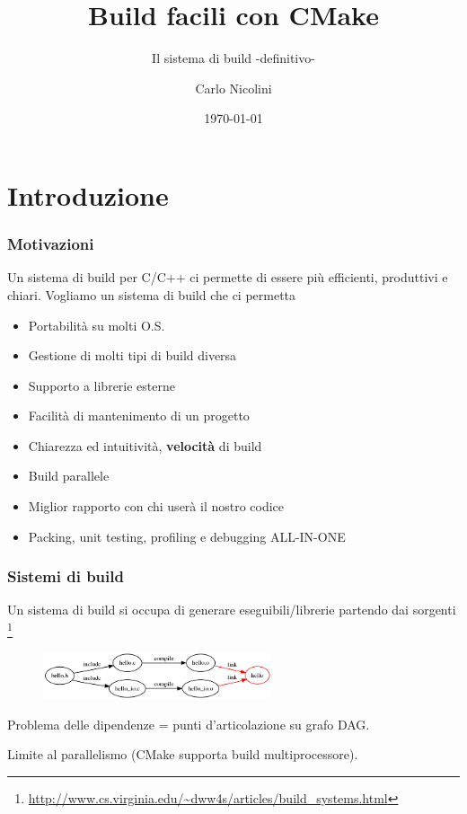 \documentclass[10pt] {beamer}
\title{Build facili con CMake}
\subtitle{Il sistema di build -definitivo-}
\author{Carlo Nicolini}
\date{\today}
\begin{document}
\frame{\titlepage}


\section{Introduzione}
\begin{frame}
\frametitle{Motivazioni}
Un sistema di build per C/C++ ci permette di essere più efficienti, produttivi e chiari.
Vogliamo un sistema di build che ci permetta
\begin{itemize}
\item<1-> Portabilità su molti O.S.
\item<2-> Gestione di molti tipi di build diversa
\item<3-> Supporto a librerie esterne
\item<4-> Facilità di mantenimento di un progetto
\item<5-> Chiarezza ed intuitività, \textbf{velocità} di build
\item<6-> Build parallele
\item<7-> Miglior rapporto con chi userà il nostro codice
\item<8-> Packing, unit testing, profiling e debugging ALL-IN-ONE
\end{itemize}
\end{frame}

\begin{frame}
\frametitle{Sistemi di build}
Un sistema di build si occupa di generare eseguibili/librerie partendo dai sorgenti \footnote{\url{http://www.cs.virginia.edu/~dww4s/articles/build_systems.html}}
\begin{figure}[htb]
 \centering
 \includegraphics[width=0.6\textwidth]{images/hello_digraph.png}
\end{figure}
Problema delle dipendenze = punti d'articolazione su grafo DAG.

Limite al parallelismo (CMake supporta build multiprocessore).
\end{frame}
\end{document}
